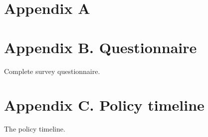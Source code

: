 \documentclass[a4paper, 12pt]{article}
\begin{document}
\section{Appendix A}

\section{Appendix B. Questionnaire}
Complete survey questionnaire.

\section{Appendix C. Policy timeline}
The policy timeline.





\end{document}
